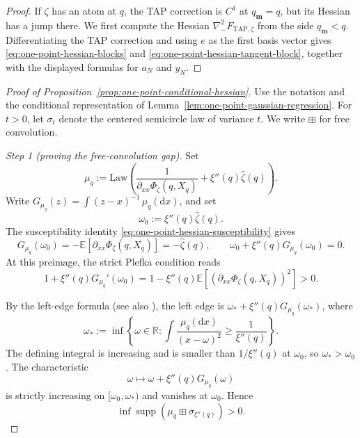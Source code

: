 \documentclass[a4paper,10pt,reqno]{amsart}
\numberwithin{equation}{section}
\newcommand{\dE}{\mathbb{E}}%
\newcommand{\Law}{\mathrm{Law}}
\newcommand{\dd}{\mathrm{d}}
\newcommand{\TAP}{\mathrm{TAP}}
\newcommand{\bfm}{\mathbf{m}}
\begin{document}
\begin{proof}
		If \(\zeta\) has an atom at \(q\), the TAP correction is
		\(C^1\) at \(q_\bfm=q\), but its Hessian has a jump there. We first
		compute the Hessian \(\nabla_-^2F_{\TAP,\zeta}\) from the side
		\(q_\bfm<q\). Differentiating the TAP correction and using \(e\)
		as the first basis vector gives
		\eqref{eq:one-point-hessian-blocks} and
		\eqref{eq:one-point-hessian-tangent-block}, together with the
		displayed formulas for \(a_N\) and \(y_N\).
	\end{proof}
	
	
	
	
	
	
	\begin{proof}[Proof of Proposition~\ref{prop:one-point-conditional-hessian}]
		Use the notation and the conditional representation of
		Lemma~\ref{lem:one-point-gaussian-regression}.
		For \(t>0\), let \(\sigma_t\) denote the centered semicircle law
		of variance \(t\). We write \(\boxplus\) for free convolution.
		
		\medskip\noindent\emph{Step 1 (proving the free-convolution gap).}
		Set
		\[
		\mu_q
		:=
		\Law\left(
		\frac1{\partial_{xx}\Phi_\zeta(q,X_q)}
		+\xi''(q)\widehat\zeta(q)
		\right).
		\]
		Write \(G_{\mu_q}(z)=\int(z-x)^{-1}\,\mu_q(\dd x)\), and set
		\[
		\omega_0:=\xi''(q)\widehat\zeta(q).
		\]
		The susceptibility identity
		\eqref{eq:one-point-hessian-susceptibility} gives
		\[
		G_{\mu_q}(\omega_0)
		=-\dE\left[\partial_{xx}\Phi_\zeta(q,X_q)\right]
		=-\widehat\zeta(q),
		\qquad
		\omega_0+\xi''(q)G_{\mu_q}(\omega_0)=0.
		\]
		At this preimage, the strict Plefka condition reads
		\[
		1+\xi''(q)G_{\mu_q}'(\omega_0)
		=
		1-\xi''(q)\dE\left[
		\left(
		\partial_{xx}\Phi_\zeta(q,X_q)
		\right)^2
		\right]>0.
		\]
		
		By the left-edge formula \cite[Eq.~(C.16)]{TAPIsing}
		\textup{(}see also
		\cite[Lemmas~2 and~4 and Corollary~3]{Biane1997}\textup{)},
		the left edge is
		\(\omega_*+\xi''(q)G_{\mu_q}(\omega_*)\), where
		\[
		\omega_*
		:=
		\inf\left\{
		\omega\in\mathbb R:
		\int\frac{\mu_q(\dd x)}{(x-\omega)^2}
		\ge\frac1{\xi''(q)}
		\right\}.
		\]
		The defining integral is increasing and is smaller than
		\(1/\xi''(q)\) at \(\omega_0\), so \(\omega_*>\omega_0\).
		The characteristic
		\[
		\omega\longmapsto
		\omega+\xi''(q)G_{\mu_q}(\omega)
		\]
		is strictly increasing on \([\omega_0,\omega_*)\) and vanishes at
		\(\omega_0\). Hence
		\[
		\inf\operatorname{supp}
		\left(\mu_q\boxplus\sigma_{\xi''(q)}\right)>0.
		\]
		

\end{proof}
\end{document}
